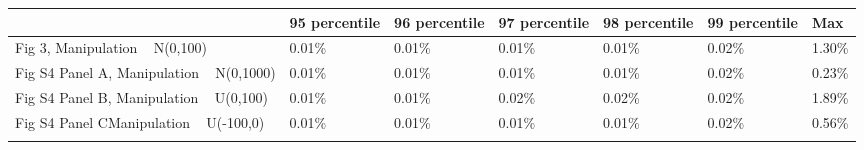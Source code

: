 \begin{table}[tbp] \centering
{}

{\tiny
\begin{tabularx}{\textwidth}{lCCCCCC}

\toprule
{}&{95 percentile}&{96 percentile}&{97 percentile}&{98 percentile}&{99 percentile}&{Max} \tabularnewline
\midrule\addlinespace[1.5ex]
Fig 3, Manipulation ~ N(0,100)&0.01\%&0.01\%&0.01\%&0.01\%&0.02\%&1.30\% \tabularnewline
\midrule Fig S4 Panel A, Manipulation ~ N(0,1000)&0.01\%&0.01\%&0.01\%&0.01\%&0.02\%&0.23\% \tabularnewline
\midrule Fig S4 Panel B, Manipulation ~ U(0,100)&0.01\%&0.01\%&0.02\%&0.02\%&0.02\%&1.89\% \tabularnewline
\midrule Fig S4 Panel CManipulation ~ U(-100,0)&0.01\%&0.01\%&0.01\%&0.01\%&0.02\%&0.56\% \tabularnewline
\midrule 
\bottomrule \addlinespace[1.5ex]

\end{tabularx}
}
\end{table}
